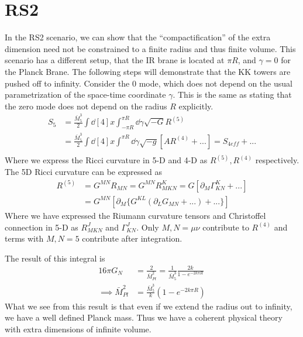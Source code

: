 \documentclass[12pt]{article}
\newcommand{\pd}{\partial}
\begin{document}
\section{RS2}
In the RS2 scenario, we can show that the ``compactification'' of the extra
dimension need not be constrained to a finite radius and thus finite volume.
This scenario has a different setup, that the IR brane is located at $\pi R$,
and $\gamma = 0$ for the Planck Brane. The following steps will demonstrate that
the KK towers are pushed off to infinity.
Consider the 0 mode, which does not depend on the usual parametrization of the
space-time coordinate $\gamma$. This is the same as stating that the zero mode
does not depend on the radius $R$ explicitly.
\begin{align}
    S_5 &= \frac{\bar{M}_5^3}{2} \int \dd[4]{x} \int^{\pi R}_{-\pi R}
    \dd{\gamma} \sqrt{-G}R^{(5)} \\
    &= \frac{\bar{M}_5^3}{2} \int \dd[4]{x} \int^{\pi R}
    \dd{\gamma} \sqrt{-g}[AR^{(4)} + ...] = S_{4 eff} + ...\\
\end{align}
Where we express the Ricci curvature in 5-D and 4-D as $R^{(5)}, R^{(4)}$
respectively. The 5D Ricci curvature can be expressed as
\begin{align}
    R^{(5)} &= G^{MN}R_{MN} = G^{MN}R^K_{MKN} = G[ \pd_M \Gamma^K_{KN} + ... ] \\
            &= G^{MN}[ \pd_M \{ G^{KL}( \pd_L G_{MN} + ... ) + ... \} ]
\end{align}
Where we have expressed the Riumann curvature tensors and Christoffel
connection in 5-D as $R^J_{MKN}$ and $\Gamma^J_{KN}$. Only $M,N = \mu\nu$
contribute to $R^{(4)}$ and terms with $M,N=5$ contribute after integration.

The result of this integral is
\begin{align}
    16\pi G_N &= \frac{2}{\bar{M}_{Pl}^2} = \frac{1}{\bar{M}^3_5} \frac{2k}{1 -
    e^{-2k\pi R}} \\
    \implies \bar{M}^2_{Pl} &= \frac{\bar{M}^3_5}{k} (1 - e^{-2k\pi R})
\end{align}
What we see from this result is that even if we extend the radius out to
infinity, we have a well defined Planck mass. Thus we have a coherent physical
theory with extra dimensions of infinite volume. 
\end{document}

